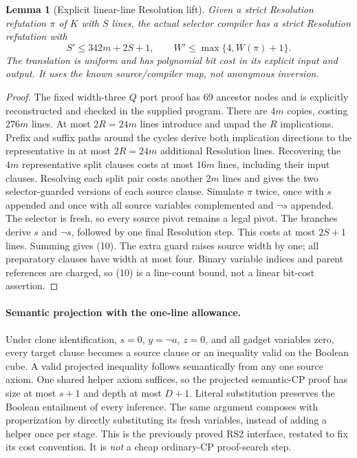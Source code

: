 \documentclass[11pt]{article}
\newtheorem{lemma}[theorem]{Lemma}
\begin{document}
\begin{lemma}[Explicit linear-line Resolution lift]\label{lem:upper}
Given a strict Resolution refutation $\pi$ of $K$ with $S$ lines, the actual
selector compiler has a strict Resolution refutation with
\[
                 S'\le342m+2S+1,\qquad
                 W'\le\max\{4,W(\pi)+1\}.              \tag{10}
\]
The translation is uniform and has polynomial bit cost in its explicit input
and output. It uses the known source/compiler map, not anonymous inversion.
\end{lemma}
\begin{proof}
The fixed width-three $Q$ port proof has 69 ancestor nodes and is explicitly
reconstructed and checked in the supplied program. There are $4m$ copies,
costing $276m$ lines. At most $2R=24m$ lines introduce and unpad the $R$
implications. Prefix and suffix paths around the cycles derive both
implication directions to the representative in at most $2R=24m$ additional
Resolution lines. Recovering the $4m$ representative split clauses costs
at most $16m$ lines, including their input clauses. Resolving each split pair
costs another $2m$ lines and gives the two selector-guarded versions of
each source clause. Simulate $\pi$ twice, once with $s$ appended and once
with all source variables complemented and $\neg s$ appended. The selector
is fresh, so every source pivot remains a legal pivot. The branches derive
$s$ and $\neg s$, followed by one final Resolution step. This costs at most
$2S+1$ lines. Summing gives (10). The extra guard raises source width by one;
all preparatory clauses have width at most four. Binary variable indices and
parent references are charged, so (10) is a line-count bound, not a linear
bit-cost assertion.
\end{proof}

\paragraph{Semantic projection with the one-line allowance.}
Under clone identification, $s=0$, $y=\neg a$, $z=0$, and all gadget
variables zero, every target clause becomes a source clause or an inequality
valid on the Boolean cube. A valid projected inequality follows semantically
from any one source axiom. One shared helper axiom suffices, so the projected
semantic-CP proof has size at most $s+1$ and depth at most $D+1$. Literal
substitution preserves the Boolean entailment of every inference. The same
argument composes with properization by directly substituting its fresh
variables, instead of adding a helper once per stage. This is the previously
proved RS2 interface, restated to fix its cost convention. It is \emph{not}
a cheap ordinary-CP proof-search step.
\end{document}
